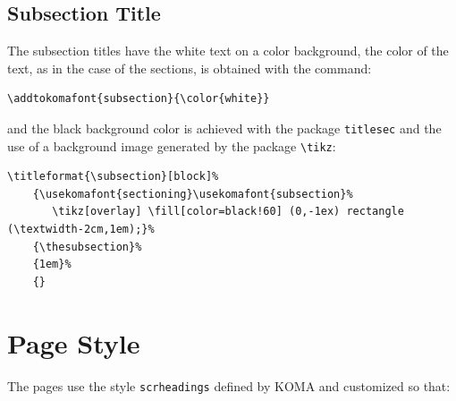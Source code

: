 \documentclass[a4paper,
                             twoside,
                             BCOR=1.0cm,
                             DIV=11,
                             parskip=full,
                             11pt]{scrbook}
\begin{document}
\subsection{Subsection Title}\label{sbsec:subsectit}
The subsection titles have the white text on a color background, the color of the text, as in the case of the sections, is obtained with the command:
\begin{scriptsize}
    \begin{verbatim}
\addtokomafont{subsection}{\color{white}}
\end{verbatim}
\end{scriptsize}
and the black background color is achieved with the package \verb+titlesec+ and the use of a background image generated by the package \verb+\tikz+:
\begin{tiny}
    \begin{verbatim}
\titleformat{\subsection}[block]%              
    {\usekomafont{sectioning}\usekomafont{subsection}% 
       \tikz[overlay] \fill[color=black!60] (0,-1ex) rectangle (\textwidth-2cm,1em);}%  
    {\thesubsection}%                   
    {1em}%
    {}
\end{verbatim}
\end{tiny}

\section{Page Style} \label{sec:pagstyle}
The pages use the style \verb+scrheadings+ defined by KOMA and customized so that:
\end{document}
